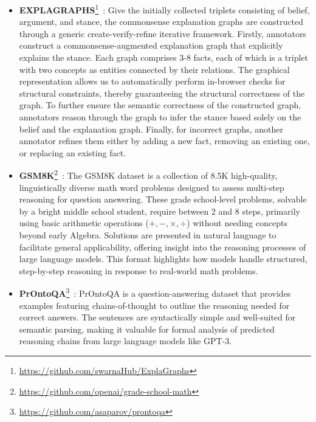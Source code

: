 \begin{itemize}[leftmargin=*]
    

    \item \textbf{EXPLAGRAPHS}\footnote{\href{https://github.com/swarnaHub/ExplaGraphs}{https://github.com/swarnaHub/ExplaGraphs}}~\cite{saha2021explagraphs}: Give the initially collected triplets consisting of belief, argument, and stance, the commonsense explanation graphs are constructed through a generic create-verify-refine iterative framework. Firstly, annotators construct a commonsense-augmented explanation graph that explicitly explains the stance. Each graph comprises 3-8 facts, each of which is a triplet with two concepts as entities connected by their relations. The graphical representation allows us to automatically perform in-browser checks for structural constraints, thereby guaranteeing the structural correctness of the graph. To further ensure the semantic correctness of the constructed graph, annotators reason through the graph to infer the stance based solely on the belief and the explanation graph. Finally, for incorrect graphs, another annotator refines them either by adding a new fact, removing an existing one, or replacing an existing fact.

    \item \textbf{GSM8K}\footnote{\href{https://github.com/openai/grade-school-math}{https://github.com/openai/grade-school-math}}~\cite{cobbe2021training}: The GSM8K dataset is a collection of 8.5K high-quality, linguistically diverse math word problems designed to assess multi-step reasoning for question answering. These grade school-level problems, solvable by a bright middle school student, require between 2 and 8 steps, primarily using basic arithmetic operations ($+, -, \times, \div$) without needing concepts beyond early Algebra. Solutions are presented in natural language to facilitate general applicability, offering insight into the reasoning processes of large language models. This format highlights how models handle structured, step-by-step reasoning in response to real-world math problems.


    \item \textbf{PrOntoQA}\footnote{\href{https://github.com/asaparov/prontoqa}{https://github.com/asaparov/prontoqa}}~\cite{saparov2022language}: PrOntoQA is a question-answering dataset that provides examples featuring chains-of-thought to outline the reasoning needed for correct answers. The sentences are syntactically simple and well-suited for semantic parsing, making it valuable for formal analysis of predicted reasoning chains from large language models like GPT-3.
    
\end{itemize}


